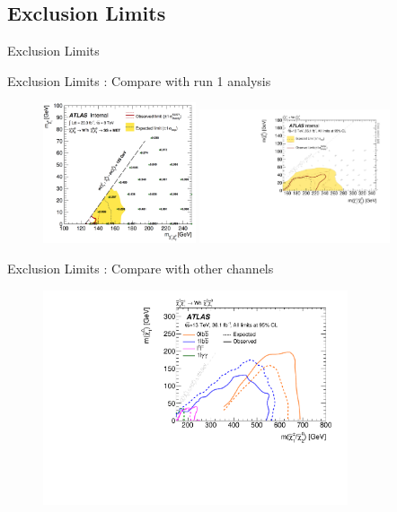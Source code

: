 \documentclass[mathserif,serif]{beamer}
\begin{document}
\subsection{Exclusion Limits}
\begin{frame}
\begin{center}
\huge
Exclusion Limits
\end{center}
\end{frame}

\begin{frame}{Exclusion Limits : Compare with run 1 analysis}
\begin{figure}
\includegraphics[width=0.4\textwidth]{data/photo/theory/run1.png}
\includegraphics[width=0.5\textwidth]{data/plot/HistFitterResults/contourPlotterWhSS_upperLimit.pdf}
\end{figure}
\end{frame}

\begin{frame}{Exclusion Limits : Compare with other channels}
\begin{figure}
\includegraphics[width=0.8\textwidth]{data/plot/HistFitterResults/Whsummary.pdf}
\end{figure}
\end{frame}
\end{document}
